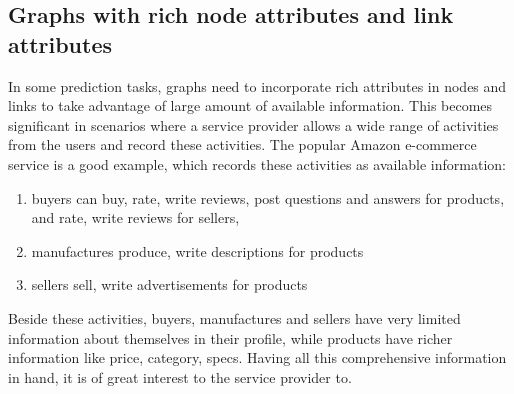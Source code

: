 \documentclass{article}
\begin{document}
\subsection{Graphs with rich node attributes and link attributes}
In some prediction tasks, graphs need to incorporate rich attributes in nodes and links to take advantage of large amount of available information. This becomes significant in scenarios where a service provider allows a wide range of activities from the users and record these activities. The popular Amazon e-commerce service is a good example, which records these activities as available information:
\begin{enumerate}
	\item buyers can buy, rate, write reviews, post questions and answers for products, and rate, write reviews for sellers, 
	\item manufactures produce, write descriptions for products
	\item sellers sell, write advertisements for products
\end{enumerate}
Beside these activities, buyers, manufactures and sellers have very limited information about themselves in their profile, while products have richer information like price, category, specs. Having all this comprehensive information in hand, it is of great interest to the service provider to.



\end{document}
